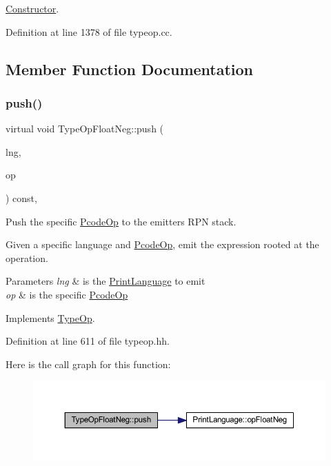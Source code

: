 \mbox{\hyperlink{class_constructor}{Constructor}}. 



Definition at line 1378 of file typeop.\+cc.



\subsection{Member Function Documentation}
\mbox{\label{class_type_op_float_neg_a5a17bc9f76459084cffbb4ba1de799d0}} 
\subsubsection{\texorpdfstring{push()}{push()}}
{\footnotesize\ttfamily virtual void Type\+Op\+Float\+Neg\+::push (\begin{DoxyParamCaption}\item[{\mbox{\hyperlink{class_print_language}{Print\+Language}} $\ast$}]{lng,  }\item[{const \mbox{\hyperlink{class_pcode_op}{Pcode\+Op}} $\ast$}]{op }\end{DoxyParamCaption}) const\hspace{0.3cm}{\ttfamily [inline]}, {\ttfamily [virtual]}}



Push the specific \mbox{\hyperlink{class_pcode_op}{Pcode\+Op}} to the emitter\textquotesingle{}s R\+PN stack. 

Given a specific language and \mbox{\hyperlink{class_pcode_op}{Pcode\+Op}}, emit the expression rooted at the operation. 
\begin{DoxyParams}{Parameters}
{\em lng} & is the \mbox{\hyperlink{class_print_language}{Print\+Language}} to emit \\
\hline
{\em op} & is the specific \mbox{\hyperlink{class_pcode_op}{Pcode\+Op}} \\
\hline
\end{DoxyParams}


Implements \mbox{\hyperlink{class_type_op_ac9c9544203ed74dabe6ac662b653b2af}{Type\+Op}}.



Definition at line 611 of file typeop.\+hh.

Here is the call graph for this function\+:
\nopagebreak
\begin{figure}[H]
\begin{center}
\leavevmode
\includegraphics[width=350pt]{class_type_op_float_neg_a5a17bc9f76459084cffbb4ba1de799d0_cgraph}
\end{center}
\end{figure}


